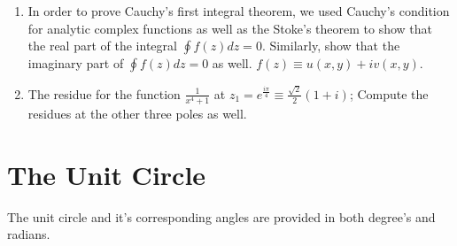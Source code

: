 \documentclass[12pt]{article}
\begin{document}
\begin{enumerate}
	\item In order to prove Cauchy's first integral theorem, we used Cauchy's condition for analytic complex functions as well as the Stoke's theorem to show that the real part of the integral $\oint f(z)dz=0$. Similarly, show that the imaginary part of $\oint f(z)dz=0$ as well. $f(z) \equiv u(x,y)+iv(x,y)$.

	\item The residue for the function $\frac{1}{x^{4}+1}$ at $z_{1}=e^{\frac{i\pi}{4}} \equiv \frac{\sqrt{2}}{2}(1+i)$; Compute the residues at the other three poles as well.

\end{enumerate}


\newpage
\section{The Unit Circle}
The unit circle and it's corresponding angles are provided in both degree's and radians.
\end{document}
